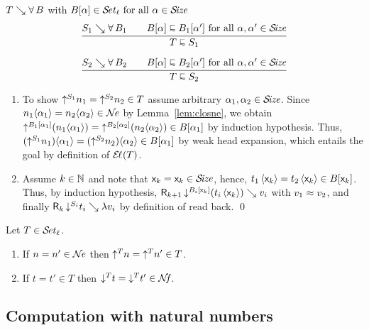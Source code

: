 \documentclass[acmsmall,screen]{acmart}\settopmatter{}
\makeatletter
\newenvironment{proof*}[1][\proofname]{\par
  \normalfont \topsep6\p@\@plus6\p@\relax
  \trivlist
  \item[\@proofindent\hskip\labelsep
        {\@proofnamefont #1\@addpunct{.}}]\ignorespaces
}{%
  \endtrivlist\@endpefalse
}
\makeatother
\begin{document}
\begin{proof*}
\begin{caselist}
\nextcase $T \evalsto \forallT B$ with $B[\alpha] \in \SET[\ell] \mforall \alpha \in \SIZE$
\begin{gather*}
  \ru{S_1 \evalsto \forallT{B_1} \qquad
      B[\alpha] \shape B_1[\alpha'] \mforall \alpha, \alpha' \in \SIZE
    }{T \shape S_1}
\\[1.5ex]
  \ru{S_2 \evalsto \forallT{B_2} \qquad
      B[\alpha] \shape B_2[\alpha'] \mforall \alpha, \alpha' \in \SIZE
    }{T \shape S_2}
\end{gather*}
\begin{enumerate}
\item To show $\up{S_1}{n_1} = \up{S_2}{n_2} \in T$ assume arbitrary $\alpha_1,\alpha_2 \in \SIZE$.
  Since $n_1 \ann{\alpha_1} = n_2 \ann{\alpha_2} \in \NE$ by Lemma~\ref{lem:closne}, we obtain
  $\up{B_1[\alpha_1]}{(n_1 \ann{\alpha_1})} = \up{B_2[\alpha_2]}{(n_2 \ann{\alpha_2})} \in B[\alpha_1]$
  by induction hypothesis.
  Thus, $(\up{S_1}{n_1}) \ann{\alpha_1} = (\up{S_2}{n_2}) \ann{\alpha_2} \in B[\alpha_1]$
  by weak head expansion, which entails the goal by definition of $\EL(T)$.
\item Assume $k \in \NN$ and note that $\lev k = \lev k \in \SIZE$, hence,
  $t_1\,\ann{\lev k} = t_2\,\ann{\lev k} \in B[\lev k]$.  Thus, by induction hypothesis,
  $\R{k+1}{\down{B_i[\lev k]}(t_i\,\ann{\lev k})}{v_i}$ with $v_1 \nfeq v_2$, and finally
  $\R k {\down{S_i} t_i} {\lambda v_i}$ by definition of read back.
\qed
\end{enumerate}

\end{caselist}
\end{proof*}

\begin{corollary}
  \label{cor:rere}
  Let\/ $T \in \SET[\ell]$.
  \begin{enumerate}
  \item If\/ $n = n' \in \NE$ then $\up T n = \up T n' \in T$.
  \item If\/ $t = t' \in T$ then $\down T t = \down T {t'} \in \NF$.
  \end{enumerate}
\end{corollary}


\subsection{Computation with natural numbers}
\label{sec:comp}
\end{document}
